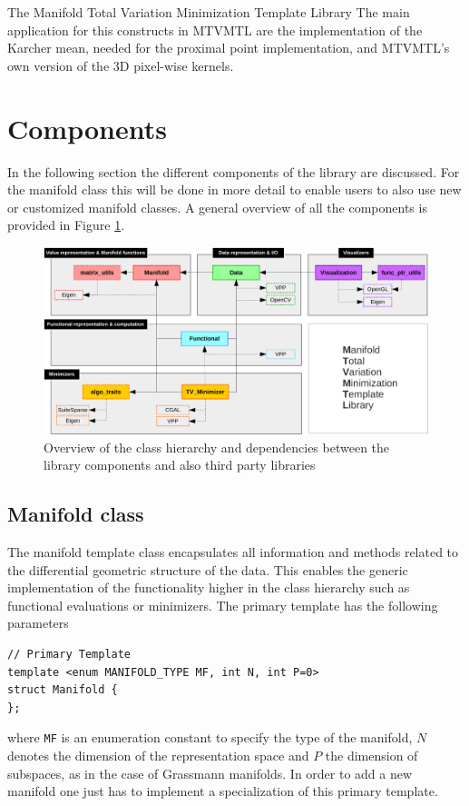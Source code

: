 \begin{chapter}{The Manifold Total Variation Minimization Template Library}
The main application for this constructs in MTVMTL are the implementation of the Karcher mean, needed for the proximal point implementation, and MTVMTL's own version
of the 3D pixel-wise kernels.


\section{Components} %
\label{sec:Components}
In the following section the different components of the library are discussed. For the manifold class this will be done in more detail to enable users to
also use new or customized manifold classes. A general overview of all the components is provided in Figure \ref{fig:components}.
\begin{figure}[h!]
        \centering
	    \includegraphics[width=1.0\linewidth]{./figures/library/components.pdf}
	\caption[Overview of library components]{Overview of the class hierarchy and dependencies between the library components and also third party libraries
	}
	\label{fig:components}
\end{figure}

\subsection{Manifold class} %
\label{sub:Manifold classes}
The manifold template class encapsulates all information and methods related to the differential geometric structure of the data. 
This enables the generic implementation of the functionality higher in the class hierarchy such as functional evaluations or minimizers.
The primary template has the following parameters
\cppinline
\begin{lstlisting}
// Primary Template
template <enum MANIFOLD_TYPE MF, int N, int P=0>
struct Manifold {
}; 
\end{lstlisting}
where \texttt{MF} is an enumeration constant to specify the type of the manifold, $N$ denotes the dimension of the representation space and $P$ the dimension of subspaces,
as in the case of Grassmann manifolds. In order to add a new manifold one just has to implement a specialization of this primary template.\\


\end{chapter}
